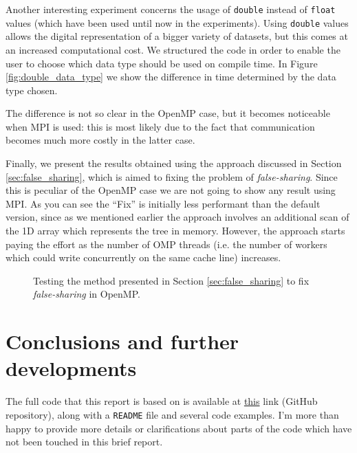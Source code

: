 \documentclass{article}
\begin{document}
Another interesting experiment concerns the usage of \texttt{double} instead of
\texttt{float} values (which have been used until now in the experiments). Using
\texttt{double} values allows the digital representation of a bigger variety
of datasets, but this comes at an increased computational cost. We structured
the code in order to enable the user to choose which data type should be used
on compile time. In Figure \ref{fig:double_data_type} we show the difference
in time determined by the data type chosen.

The difference is not so clear in the OpenMP case, but it becomes noticeable
when MPI is used: this is most likely due to the fact that communication
becomes much more costly in the latter case.

Finally, we present the results obtained using the approach discussed in Section
\ref{sec:false_sharing}, which is aimed to fixing the problem of
\emph{false-sharing}. Since this is peculiar of the OpenMP case we are not going
to show any result using MPI. As you can see the ``Fix'' is initially less
performant than the default version, since as we mentioned earlier the approach
involves an additional scan of the 1D array which represents the tree in
memory. However, the approach starts paying the effort as the number of OMP
threads (i.e. the number of workers which could write concurrently on the same
cache line) increases.

\begin{figure}[t!]
    \centering
    \caption{Testing the method presented in Section \ref{sec:false_sharing} to fix \emph{false-sharing} in OpenMP.}
\end{figure}

\section{Conclusions and further developments}
The full code that this report is based on is available at
\href{https://github.com/fAndreuzzi/parallel-kd-tree}{this} link (GitHub
repository), along with a \texttt{README} file and several code examples. I'm
more than happy to provide more details or clarifications about parts of the
code which have not been touched in this brief report.
\end{document}
